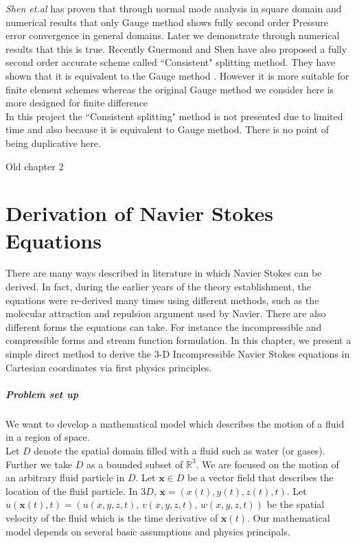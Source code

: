 \emph{Shen et.al} has proven that through normal mode analysis in square domain and numerical results that only Gauge method shows fully second order Pressure error convergence in general domains. Later we demonstrate through numerical results that this is true. Recently Guermond and Shen have also proposed a fully second order accurate scheme called ``Consistent" splitting method. They have shown that it is equivalent to the Gauge method \cite{wong2006consistent,pyo2005normal,guermond2006overview}. However it is more suitable for finite element schemes whereas the original Gauge method we consider here is more designed for finite difference \cite{pyo2005normal}\\

In this project the ``Consistent splitting" method is not presented due to limited time and also because it is equivalent to Gauge method. There is no point of being duplicative here.

Old chapter 2
\chapter{Derivation of Navier Stokes Equations}
\label{chapter2}
There are many ways described in literature in which Navier Stokes can be derived. In fact, during the earlier years of the theory establishment, the equations were re-derived many times using different methods, such as the molecular attraction and repulsion argument used by Navier. There are also different forms the equations can take. For instance the incompressible and compressible forms and stream function formulation. In this chapter, we present a simple direct method to derive the 3-D Incompressible Navier Stokes equations in Cartesian coordinates via first physics principles.\\

\paragraph{Problem set up}
We want to develop a mathematical model which describes the motion of a fluid in a region of space. \\
Let $D$ denote the spatial domain filled with a fluid such as water (or gases). Further we take $D$ as a bounded subset of $\mathbb{R}^3$. We are focused on the motion of an arbitrary fluid particle in $D$. Let $\textbf{x} \in D$ be a vector field that describes the location of the fluid particle. In $3D$, $\textbf{x} = (x(t), y(t), z(t), t)$. Let $u(\textbf{x}(t), t) = \left( u(x,y,z,t),\,v(x,y,z,t),\,w(x,y,z,t)\right)$ be the spatial velocity of the fluid which is the time derivative of $\textbf{x}(t)$. Our mathematical model depends on several basic assumptions and physics principals.\\

